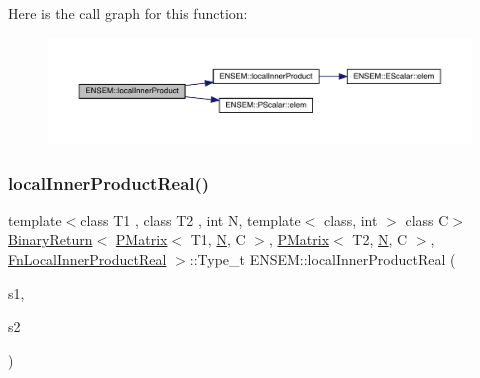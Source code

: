 Here is the call graph for this function\+:\nopagebreak
\begin{figure}[H]
\begin{center}
\leavevmode
\includegraphics[width=350pt]{df/d0a/group__primmatrix_gaaa8729c59af4a03489be7e620e3dd187_cgraph}
\end{center}
\end{figure}
\mbox{\label{group__primmatrix_ga512767c96aa10eafdf3b60be8dd2e9bb}} 
\subsubsection{\texorpdfstring{localInnerProductReal()}{localInnerProductReal()}\hspace{0.1cm}{\footnotesize\ttfamily [1/3]}}
{\footnotesize\ttfamily template$<$class T1 , class T2 , int N, template$<$ class, int $>$ class C$>$ \\
\mbox{\hyperlink{structENSEM_1_1BinaryReturn}{Binary\+Return}}$<$ \mbox{\hyperlink{classENSEM_1_1PMatrix}{P\+Matrix}}$<$ T1, \mbox{\hyperlink{operator__name__util_8cc_a7722c8ecbb62d99aee7ce68b1752f337}{N}}, C $>$, \mbox{\hyperlink{classENSEM_1_1PMatrix}{P\+Matrix}}$<$ T2, \mbox{\hyperlink{operator__name__util_8cc_a7722c8ecbb62d99aee7ce68b1752f337}{N}}, C $>$, \mbox{\hyperlink{structENSEM_1_1FnLocalInnerProductReal}{Fn\+Local\+Inner\+Product\+Real}} $>$\+::Type\+\_\+t E\+N\+S\+E\+M\+::local\+Inner\+Product\+Real (\begin{DoxyParamCaption}\item[{const \mbox{\hyperlink{classENSEM_1_1PMatrix}{P\+Matrix}}$<$ T1, \mbox{\hyperlink{operator__name__util_8cc_a7722c8ecbb62d99aee7ce68b1752f337}{N}}, C $>$ \&}]{s1,  }\item[{const \mbox{\hyperlink{classENSEM_1_1PMatrix}{P\+Matrix}}$<$ T2, \mbox{\hyperlink{operator__name__util_8cc_a7722c8ecbb62d99aee7ce68b1752f337}{N}}, C $>$ \&}]{s2 }\end{DoxyParamCaption})\hspace{0.3cm}{\ttfamily [inline]}}

